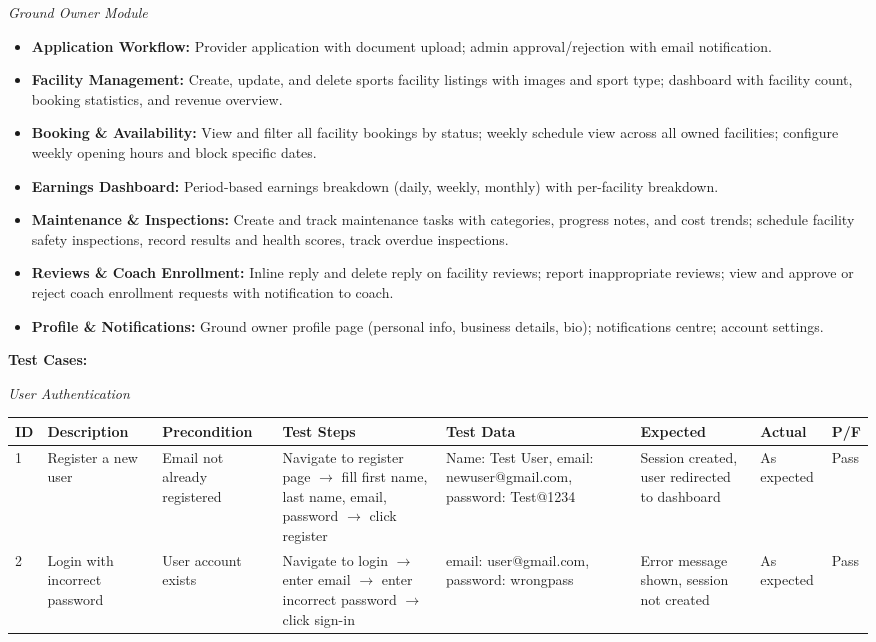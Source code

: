 \documentclass[12pt,a4paper]{report}
\begin{document}
\textit{Ground Owner Module}
\begin{itemize}[leftmargin=1.5cm]
  \item \textbf{Application Workflow:} Provider application with document upload; admin approval/rejection with email notification.
  \item \textbf{Facility Management:} Create, update, and delete sports facility listings with images and sport type; dashboard with facility count, booking statistics, and revenue overview.
  \item \textbf{Booking \& Availability:} View and filter all facility bookings by status; weekly schedule view across all owned facilities; configure weekly opening hours and block specific dates.
  \item \textbf{Earnings Dashboard:} Period-based earnings breakdown (daily, weekly, monthly) with per-facility breakdown.
  \item \textbf{Maintenance \& Inspections:} Create and track maintenance tasks with categories, progress notes, and cost trends; schedule facility safety inspections, record results and health scores, track overdue inspections.
  \item \textbf{Reviews \& Coach Enrollment:} Inline reply and delete reply on facility reviews; report inappropriate reviews; view and approve or reject coach enrollment requests with notification to coach.
  \item \textbf{Profile \& Notifications:} Ground owner profile page (personal info, business details, bio); notifications centre; account settings.
\end{itemize}

\textbf{Test Cases:}

\textit{User Authentication}

\begin{center}
\footnotesize
\begin{longtable}{p{0.4cm} p{2.2cm} p{1.8cm} p{3.2cm} p{2.2cm} p{2.2cm} p{1.4cm} p{0.8cm}}
\toprule
\textbf{ID} & \textbf{Description} & \textbf{Precondition} & \textbf{Test Steps} & \textbf{Test Data} & \textbf{Expected} & \textbf{Actual} & \textbf{P/F}\\
\midrule
\endhead
1 & Register a new user & Email not already registered & Navigate to register page $\to$ fill first name, last name, email, password $\to$ click register & Name: Test User, email: newuser@gmail.com, password: Test@1234 & Session created, user redirected to dashboard & As expected & Pass\\[4pt]
2 & Login with incorrect password & User account exists & Navigate to login $\to$ enter email $\to$ enter incorrect password $\to$ click sign-in & email: user@gmail.com, password: wrongpass & Error message shown, session not created & As expected & Pass\\
\bottomrule
\end{longtable}
\end{center}
\end{document}
